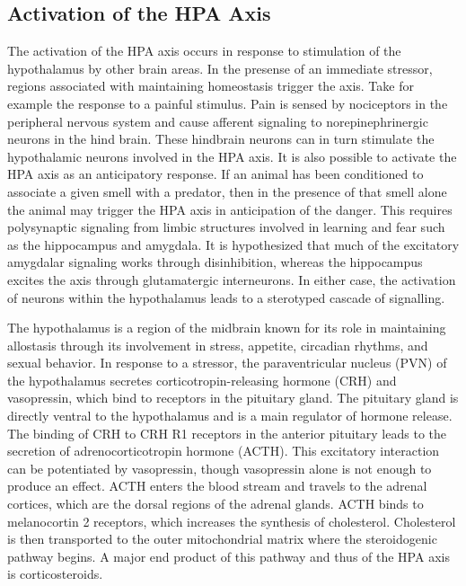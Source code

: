 \documentclass[12pt,twoside]{reedthesis}
\begin{document}
 \subsection{Activation of the HPA Axis}
 The activation of the HPA
axis occurs in response to stimulation of the hypothalamus by other 
brain areas. In the presense of an immediate stressor, regions associated with
maintaining homeostasis trigger the axis. Take for example the response to a
painful stimulus. Pain is sensed by nociceptors in the peripheral nervous system and cause afferent signaling to
norepinephrinergic neurons in the hind brain. These hindbrain neurons can in turn stimulate
the hypothalamic neurons involved in the HPA axis. It is also possible to activate the HPA axis as an
anticipatory response. If an animal has been conditioned to associate a given
smell with a predator, then in the presence of that smell
 alone the animal may trigger the HPA axis in anticipation of the danger. This requires polysynaptic signaling from limbic
structures involved in learning and fear such as the hippocampus and amygdala. It is hypothesized that much of
the excitatory amygdalar signaling works through disinhibition, whereas the hippocampus excites the axis through glutamatergic interneurons.
In either case, the activation of neurons within the hypothalamus leads to a
sterotyped cascade of signalling.

The hypothalamus is a region of the midbrain known
for its role in maintaining allostasis through its involvement in stress,
appetite, circadian rhythms, and sexual behavior. In response to a stressor, the
paraventricular nucleus (PVN) of the hypothalamus secretes
corticotropin-releasing hormone (CRH) and vasopressin, which bind to receptors
in the pituitary gland. The pituitary gland is directly ventral to the hypothalamus and is a main
regulator of hormone release. The binding of CRH to CRH R1 receptors in the
anterior pituitary leads to the secretion of adrenocorticotropin hormone (ACTH).
This excitatory interaction can be potentiated by vasopressin, though
vasopressin alone is not enough to produce an effect. ACTH enters the blood stream and travels to the adrenal cortices, which are the dorsal
regions of the adrenal glands. ACTH binds to melanocortin 2 receptors, which
increases the synthesis of cholesterol. Cholesterol is then transported to the
outer mitochondrial matrix where the steroidogenic pathway begins. A major end
product of this pathway and thus of the HPA axis is corticosteroids.
\end{document}
